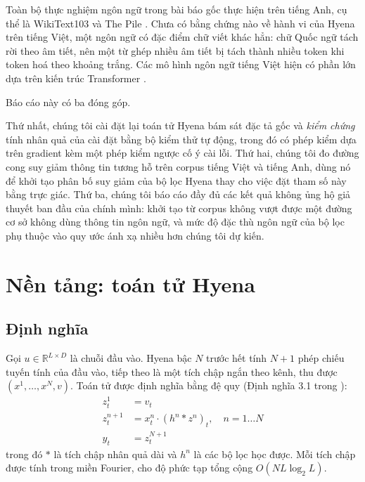 \documentclass[11pt]{article}
\begin{document}
Toàn bộ thực nghiệm ngôn ngữ trong bài báo gốc thực hiện trên tiếng Anh, cụ thể
là WikiText103 \citep{merity2017pointer} và The Pile \citep{gao2020pile}. Chưa
có bằng chứng nào về hành vi của Hyena trên tiếng Việt, một ngôn ngữ có đặc
điểm chữ viết khác hẳn: chữ Quốc ngữ tách rời theo âm tiết, nên một từ ghép
nhiều âm tiết bị tách thành nhiều token khi token hoá theo khoảng trắng. Các mô
hình ngôn ngữ tiếng Việt hiện có phần lớn dựa trên kiến trúc Transformer
\citep{nguyen2020phobert}.

Báo cáo này có ba đóng góp.

Thứ nhất, chúng tôi cài đặt lại toán tử Hyena bám sát đặc tả gốc và
\emph{kiểm chứng} tính nhân quả của cài đặt bằng bộ kiểm thử tự động, trong đó
có phép kiểm dựa trên gradient kèm một phép kiểm ngược cố ý cài lỗi.
Thứ hai, chúng tôi đo đường cong suy giảm thông tin tương hỗ trên corpus tiếng
Việt và tiếng Anh, dùng nó để khởi tạo phân bố suy giảm của bộ lọc Hyena thay
cho việc đặt tham số này bằng trực giác. Thứ ba, chúng tôi báo cáo đầy đủ các
kết quả không ủng hộ giả thuyết ban đầu của chính mình: khởi tạo từ corpus không
vượt được một đường cơ sở không dùng thông tin ngôn ngữ, và mức độ đặc thù ngôn
ngữ của bộ lọc phụ thuộc vào quy ước ánh xạ nhiều hơn chúng tôi dự kiến.

\section{Nền tảng: toán tử Hyena}

\subsection{Định nghĩa}

Gọi $u \in \mathbb{R}^{L \times D}$ là chuỗi đầu vào. Hyena bậc $N$ trước hết
tính $N+1$ phép chiếu tuyến tính của đầu vào, tiếp theo là một tích chập ngắn
theo kênh, thu được $(x^1, \dots, x^N, v)$. Toán tử được định nghĩa bằng đệ quy
(Định nghĩa 3.1 trong \citealp{poli2023hyena}):
\begin{align}
z^1_t &= v_t \nonumber\\
z^{n+1}_t &= x^n_t \cdot (h^n \ast z^n)_t, \quad n = 1 \dots N \label{eq:hyena}\\
y_t &= z^{N+1}_t \nonumber
\end{align}
trong đó $\ast$ là tích chập nhân quả dài và $h^n$ là các bộ lọc học được. Mỗi
tích chập được tính trong miền Fourier, cho độ phức tạp tổng cộng
$O(N L \log_2 L)$.
\end{document}
